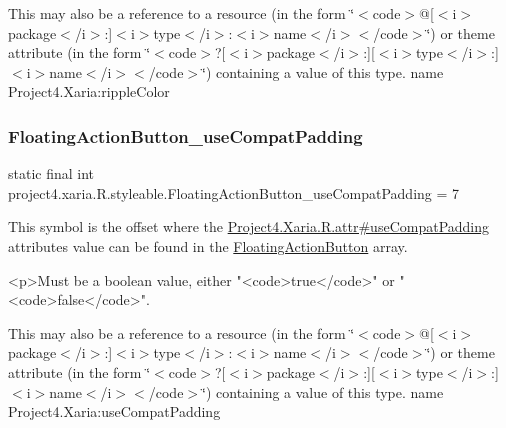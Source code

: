 This may also be a reference to a resource (in the form \char`\"{}$<$code$>$@\mbox{[}$<$i$>$package$<$/i$>$\+:\mbox{]}$<$i$>$type$<$/i$>$\+:$<$i$>$name$<$/i$>$$<$/code$>$\char`\"{}) or theme attribute (in the form \char`\"{}$<$code$>$?\mbox{[}$<$i$>$package$<$/i$>$\+:\mbox{]}\mbox{[}$<$i$>$type$<$/i$>$\+:\mbox{]}$<$i$>$name$<$/i$>$$<$/code$>$\char`\"{}) containing a value of this type.  name Project4.\+Xaria\+:ripple\+Color \mbox{\label{classproject4_1_1xaria_1_1R_1_1styleable_a234a6a0e94e66106e7873eb4647e1fcb}} 
\subsubsection{\texorpdfstring{Floating\+Action\+Button\+\_\+use\+Compat\+Padding}{FloatingActionButton\_useCompatPadding}}
{\footnotesize\ttfamily static final int project4.\+xaria.\+R.\+styleable.\+Floating\+Action\+Button\+\_\+use\+Compat\+Padding = 7\hspace{0.3cm}{\ttfamily [static]}}

This symbol is the offset where the \hyperlink{}{Project4.\+Xaria.\+R.\+attr\#use\+Compat\+Padding} attribute\textquotesingle{}s value can be found in the \hyperlink{classproject4_1_1xaria_1_1R_1_1styleable_afccbd80ac1ce5fd6f7a9ee0a1b546322}{Floating\+Action\+Button} array.

\begin{DoxyVerb}      <p>Must be a boolean value, either "<code>true</code>" or "<code>false</code>".
\end{DoxyVerb}
 

This may also be a reference to a resource (in the form \char`\"{}$<$code$>$@\mbox{[}$<$i$>$package$<$/i$>$\+:\mbox{]}$<$i$>$type$<$/i$>$\+:$<$i$>$name$<$/i$>$$<$/code$>$\char`\"{}) or theme attribute (in the form \char`\"{}$<$code$>$?\mbox{[}$<$i$>$package$<$/i$>$\+:\mbox{]}\mbox{[}$<$i$>$type$<$/i$>$\+:\mbox{]}$<$i$>$name$<$/i$>$$<$/code$>$\char`\"{}) containing a value of this type.  name Project4.\+Xaria\+:use\+Compat\+Padding \mbox{\label{classproject4_1_1xaria_1_1R_1_1styleable_a32963533d4ea1b671544e3c531ad5f97}} 
